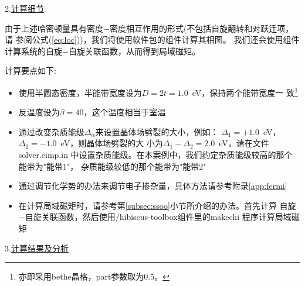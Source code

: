 2.\underline{计算细节}

由于上述哈密顿量具有密度$-$密度相互作用的形式(不包括自旋翻转和对跃迁项，请
参阅公式(\ref{eq:loc}))，我们将使用{\iqist}软件包的{\azalea}组件计算其相图。
我们还会使用{\gardenia}组件计算系统的自旋$-$自旋关联函数，从而得到局域磁矩。

计算要点如下:
\begin{itemize}
  \item 使用半圆态密度，半能带宽度设为$D = 2t =1.0$\ eV，保持两个能带宽度一
        致\footnote{亦即采用bethe晶格，part参数取为0.5。}
  \item 反温度设为$\beta = 40$，这个温度相当于室温
  \item 通过改变杂质能级$\Delta_{\alpha}$来设置晶体场劈裂的大小，例如：
        $\Delta_{1}=+1.0$\ eV，$\Delta_{2}=-1.0$\ eV，则晶体场劈裂的大
        小为$\Delta_{1}-\Delta_{2} = 2.0$\ eV，请在文件solver.eimp.in
        中设置杂质能级。在本案例中，我们约定杂质能级较高的那个能带为"能带1"，
        杂质能级较低的那个能带为"能带2"
  \item 通过调节化学势的办法来调节电子掺杂量，具体方法请参考附录\ref{app:fermi}
  \item 在计算局域磁矩时，请参考第\ref{subsec:ssoo}小节所介绍的办法。首先计算
        自旋$-$自旋关联函数，然后使用{\hibiscus}/hibiscus-toolbox组件里的makechi
        程序计算局域磁矩
\end{itemize}

3.\underline{计算结果及分析}

